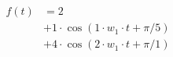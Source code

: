 \correct
\begin{center}
\begin{align*}
f(t)
&= 2 \\
&+ 1 \cdot \cos( 1 \cdot w_1 \cdot t + \pi/5) \\
&+ 4 \cdot \cos( 2 \cdot w_1 \cdot t + \pi/1)
\end{align*}
\end{center}
